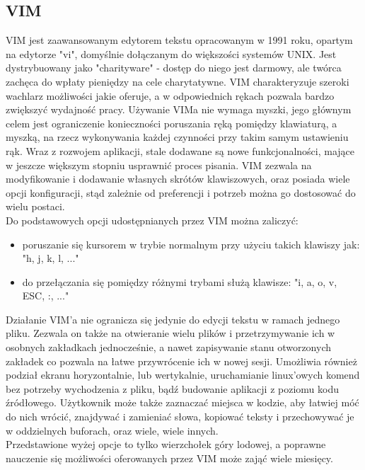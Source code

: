 \documentclass[12pt, a4paper]{article}
\begin{document}
\begin{sloppypar}
{  \subsection{VIM}
  {
    VIM jest zaawansowanym edytorem tekstu opracowanym w 1991 roku, opartym na edytorze
    "vi", domyślnie dołączanym do większości systemów UNIX. Jest dystrybuowany jako
    "charityware" - dostęp do niego jest darmowy, ale twórca zachęca do wpłaty pieniędzy
    na cele charytatywne. VIM charakteryzuje szeroki wachlarz możliwości jakie oferuje,
    a w odpowiednich rękach pozwala bardzo zwiększyć wydajność pracy. Używanie VIMa
    nie wymaga myszki, jego głównym celem jest ograniczenie konieczności poruszania ręką
    pomiędzy klawiaturą, a myszką, na rzecz wykonywania każdej czynności przy takim samym
    ustawieniu rąk. Wraz z rozwojem aplikacji, stale dodawane są nowe funkcjonalności,
    mające w jeszcze większym stopniu usprawnić proces pisania. VIM zezwala na
    modyfikowanie i dodawanie własnych skrótów klawiszowych, oraz posiada wiele opcji
    konfiguracji, stąd zależnie od preferencji i potrzeb można go dostosować do wielu
    postaci.\\
    Do podstawowych opcji udostępnianych przez VIM można zaliczyć:
    \begin{itemize}
      \item poruszanie się kursorem w trybie normalnym przy użyciu takich klawiszy jak:\\
      "h, j, k, l, ..."
      \item do przełączania się pomiędzy różnymi trybami służą klawisze:
      "i, a, o, v, ESC, :, ..."
    \end{itemize}
    Działanie VIM'a nie ogranicza się jedynie do edycji tekstu w ramach jednego pliku.
    Zezwala on także na otwieranie wielu plików i przetrzymywanie ich w osobnych zakładkach
    jednocześnie, a nawet zapisywanie stanu otworzonych zakładek co pozwala na łatwe przywrócenie
    ich w nowej sesji. Umożliwia również podział ekranu horyzontalnie, lub wertykalnie,
    uruchamianie linux'owych komend bez potrzeby wychodzenia z pliku, bądź budowanie aplikacji z
    poziomu kodu źródłowego. Użytkownik może także zaznaczać miejsca w kodzie, aby łatwiej móć do
    nich wrócić, znajdywać i zamieniać słowa, kopiować teksty i przechowywać je w oddzielnych
    buforach, oraz wiele, wiele innych. \\   
    Przedstawione wyżej opcje to tylko wierzchołek góry lodowej, a poprawne nauczenie
    się możliwości oferowanych przez VIM może zająć wiele miesięcy.
  }
}


\end{sloppypar}
\end{document}
